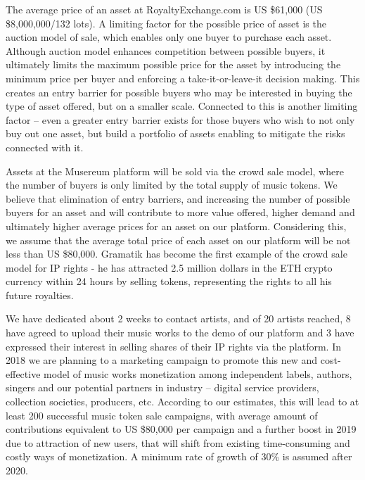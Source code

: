 \documentclass[12pt]{report}
\begin{document}

The average price of an asset at RoyaltyExchange.com is US \$61,000 (US \$8,000,000/132 lots). A limiting factor for the possible price of asset is the auction model of sale, which enables only one buyer to purchase each asset. Although auction model enhances competition between possible buyers, it ultimately limits the maximum possible price for the asset by introducing the minimum price per buyer and enforcing a take-it-or-leave-it decision making. This creates an entry barrier for possible buyers who may be interested in buying the type of asset offered, but on a smaller scale. Connected to this is another limiting factor – even a greater entry barrier exists for those buyers who wish to not only buy out one asset, but build a portfolio of assets enabling to mitigate the risks connected with it.

Assets at the Musereum platform will be sold via the crowd sale model, where the number of buyers is only limited by the total supply of music tokens. We believe that elimination of entry barriers, and increasing the number of possible buyers for an asset and will contribute to more value offered, higher demand and ultimately higher average prices for an asset on our platform. Considering this, we assume that the average total price of each asset on our platform will be not less than US \$80,000. Gramatik has become the first example of the crowd sale model for IP rights - he has attracted 2.5 million dollars in the ETH crypto currency within 24 hours by selling tokens, representing the rights to all his future royalties.

We have dedicated about 2 weeks to contact artists, and of 20 artists reached, 8 have agreed to upload their music works to the demo of our platform and 3 have expressed their interest in selling shares of their IP rights via the platform. In 2018 we are planning to a marketing campaign to promote this new and cost-effective model of music works monetization among independent labels, authors, singers and our potential partners in industry – digital service providers, collection societies, producers, etc. According to our estimates, this will lead to at least 200 successful music token sale campaigns, with average amount of contributions equivalent to US \$80,000 per campaign and a further boost in 2019 due to attraction of new users, that will shift from existing time-consuming and costly ways of monetization. A minimum rate of growth of 30\% is assumed after 2020. 
\end{document}
